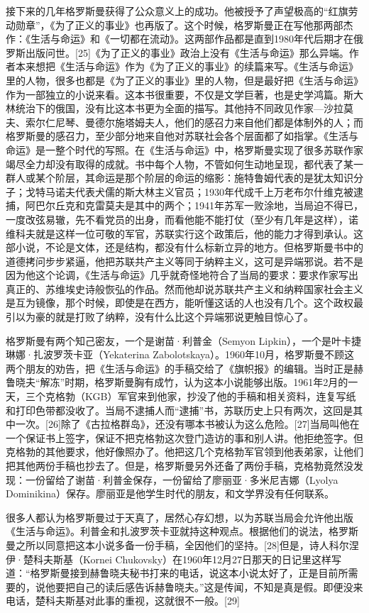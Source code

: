 接下来的几年格罗斯曼获得了公众意义上的成功。他被授予了声望极高的“红旗劳动勋章”，《为了正义的事业》也再版了。这个时候，格罗斯曼正在写他那两部杰作：《生活与命运》和《一切都在流动》。这两部作品都是直到1980年代后期才在俄罗斯出版问世。[25]《为了正义的事业》政治上没有《生活与命运》那么异端。作者本来想把《生活与命运》作为《为了正义的事业》的续篇来写。《生活与命运》里的人物，很多也都是《为了正义的事业》里的人物，但是最好把《生活与命运》作为一部独立的小说来看。这本书很重要，不仅是文学巨著，也是史学鸿篇。斯大林统治下的俄国，没有比这本书更为全面的描写。其他持不同政见作家—沙拉莫夫、索尔仁尼琴、曼德尔施塔姆夫人，他们的感召力来自他们都是体制外的人；而格罗斯曼的感召力，至少部分地来自他对苏联社会各个层面都了如指掌。《生活与命运》是一整个时代的写照。在《生活与命运》中，格罗斯曼实现了很多苏联作家竭尽全力却没有取得的成就。书中每个人物，不管如何生动地呈现，都代表了某一群人或某个阶层，其命运是那个阶层的命运的缩影：施特鲁姆代表的是犹太知识分子；戈特马诺夫代表犬儒的斯大林主义官员；1930年代成千上万老布尔什维克被逮捕，阿巴尔丘克和克雷莫夫是其中的两个；1941年苏军一败涂地，当局迫不得已，一度改弦易辙，先不看党员的出身，而看他能不能打仗（至少有几年是这样），诺维科夫就是这样一位可敬的军官，苏联实行这个政策后，他的能力才得到承认。这部小说，不论是文体，还是结构，都没有什么标新立异的地方。但格罗斯曼书中的道德拷问步步紧逼，他把苏联共产主义等同于纳粹主义，这可是异端邪说。若不是因为他这个论调，《生活与命运》几乎就奇怪地符合了当局的要求：要求作家写出真正的、苏维埃史诗般恢弘的作品。然而他却说苏联共产主义和纳粹国家社会主义是互为镜像，那个时候，即使是在西方，能听懂这话的人也没有几个。这个政权最引以为豪的就是打败了纳粹，没有什么比这个异端邪说更触目惊心了。

格罗斯曼有两个知己密友，一个是谢苗·利普金（Semyon Lipkin），一个是叶卡捷琳娜·扎波罗茨卡亚（Yekaterina Zabolotskaya）。1960年10月，格罗斯曼不顾这两个朋友的劝告，把《生活与命运》的手稿交给了《旗帜报》的编辑。当时正是赫鲁晓夫“解冻”时期，格罗斯曼胸有成竹，认为这本小说能够出版。1961年2月的一天，三个克格勃（KGB）军官来到他家，抄没了他的手稿和相关资料，连复写纸和打印色带都没收了。当局不逮捕人而“逮捕”书，苏联历史上只有两次，这回是其中一次。[26]除了《古拉格群岛》，还没有哪本书被认为这么危险。[27]当局叫他在一个保证书上签字，保证不把克格勃这次登门造访的事和别人讲。他拒绝签字。但克格勃的其他要求，他好像照办了。他把这几个克格勃军官领到他表弟家，让他们把其他两份手稿也抄去了。但是，格罗斯曼另外还备了两份手稿，克格勃竟然没发现：一份留给了谢苗·利普金保存，一份留给了廖丽亚·多米尼吉娜（Lyolya Dominikina）保存。廖丽亚是他学生时代的朋友，和文学界没有任何联系。

很多人都认为格罗斯曼过于天真了，居然心存幻想，以为苏联当局会允许他出版《生活与命运》。利普金和扎波罗茨卡亚就持这种观点。根据他们的说法，格罗斯曼之所以同意把这本小说多备一份手稿，全因他们的坚持。[28]但是，诗人科尔涅伊·楚科夫斯基（Kornei Chukovsky）在1960年12月27日那天的日记里这样写道：“格罗斯曼接到赫鲁晓夫秘书打来的电话，说这本小说太好了，正是目前所需要的，说他要把自己的读后感告诉赫鲁晓夫。”这是传闻，不知是真是假。即便没来电话，楚科夫斯基对此事的重视，这就很不一般。[29]

